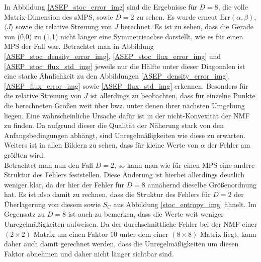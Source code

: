 \documentclass[10pt,a4paper]{report}
\begin{document}
In Abbildung \ref{ASEP_stoc_error_img} sind die Ergebnisse für $D=8$, die volle Matrix-Dimension des sMPS, sowie $D=2$ zu sehen. Es wurde erneut $\text{Err}(\alpha,\beta)$, $\langle J\rangle$ sowie die relative Streuung von $J$ berechnet. Es ist zu sehen, dass die Gerade von (0,0) zu (1,1) nicht länger eine Symmetrieachse darstellt, wie es für einen MPS der Fall war. Betrachtet man in Abbildung \ref{ASEP_stoc_density_error_img}, \ref{ASEP_stoc_flux_error_img} und \ref{ASEP_stoc_flux_std_img} jeweils nur die Hälfte unter dieser Diagonalen ist eine starke Ähnlichkeit zu den Abbildungen \ref{ASEP_density_error_img}, \ref{ASEP_flux_error_img} sowie \ref{ASEP_flux_std_img} erkennen. Besonders für die relative Streuung von $J$ ist allerdings zu beobachten, dass für einzelne Punkte die berechneten Größen weit über bwz. unter denen ihrer nächsten Umgebung liegen. Eine wahrscheinliche Ursache dafür ist in der nicht-Konvexität der NMF zu finden. Da aufgrund dieser die Qualität der Näherung stark von den Anfangsbedingungen abhängt\cite{MPS-vs-sMPS}, sind Unregelmäßigkeiten wie diese zu erwarten.
Weiters ist in allen Bildern zu sehen, dass für kleine Werte von $\alpha$ der Fehler am größten wird.\\




Betrachtet man nun den Fall $D=2$, so kann man wie für einen MPS eine andere Struktur des Fehlers feststellen. Diese Änderung ist hierbei allerdings deutlich weniger klar, da der hier der Fehler für $D=8$ annähernd dieselbe Größenordnung hat. Es ist also damit zu rechnen, dass die Struktur des Fehlers für $D=2$ der Überlagerung von diesem sowie $S_C$ aus Abbildung \ref{stoc_entropy_img} ähnelt.
Im Gegensatz zu $D=8$ ist auch zu bemerken, dass die Werte weit weniger Unregelmäßigkeiten aufweisen. Da der durchschnittliche Fehler bei der NMF einer $(2\times 2)$ Matrix um einen Faktor $10$ unter dem einer $(8\times 8)$ Matrix liegt, kann daher auch damit gerechnet werden, dass die Unregelmäßigkeiten um diesen Faktor abnehmen und daher nicht länger sichtbar sind.
\end{document}
